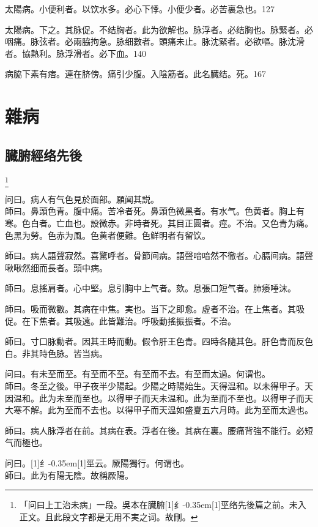 \documentclass[11pt,oneside,b5paper]{ctexbook}
\begin{document}
\begin{flushleft}
太陽病。小便利者。以饮水多。必心下悸。小便少者。必苦裏急也。127

太陽病。下之。其脉促。不结胸者。此为欲解也。脉浮者。必结胸也。脉緊者。必咽痛。脉弦者。必兩脇拘急。脉细數者。頭痛未止。脉沈緊者。必欲嘔。脉沈滑者。協熱利。脉浮滑者。必下血。140

病脇下素有痞。連在脐傍。痛引少腹。入陰筋者。此名臓结。死。167

\part{雜病}

\chapter{臓腑經络先後}

\footnote{「问曰上工治未病」一段。吳本在臓腑{\hbox{\scalebox{0.68}[1]{纟}\kern-0.35em\scalebox{0.64}[1]{巠}}}络先後篇之前。未入正文。且此段文字都是无用不実之词。故刪。}

问曰。病人有气色見於面部。願闻其説。\\
師曰。鼻頭色青。腹中痛。苦冷者死。鼻頭色微黑者。有水气。色黄者。胸上有寒。色白者。亡血也。設微赤。非時者死。其目正圓者。痙。不治。又色青为痛。色黑为勞。色赤为風。色黄者便難。色鲜明者有留饮。

師曰。病人語聲寂然。喜驚呼者。骨節间病。語聲喑喑然不徹者。心膈间病。語聲啾啾然细而長者。頭中病。

師曰。息搖肩者。心中堅。息引胸中上气者。欬。息張口短气者。肺痿唾沫。

師曰。吸而微數。其病在中焦。実也。当下之即愈。虛者不治。在上焦者。其吸促。在下焦者。其吸遠。此皆難治。呼吸動搖振振者。不治。

師曰。寸口脉動者。因其王時而動。假令肝王色青。四時各隨其色。肝色青而反色白。非其時色脉。皆当病。

问曰。有未至而至。有至而不至。有至而不去。有至而太過。何谓也。\\
師曰。冬至之後。甲子夜半少陽起。少陽之時陽始生。天得温和。以未得甲子。天因温和。此为未至而至也。以得甲子而天未温和。此为至而不至也。以得甲子而天大寒不解。此为至而不去也。以得甲子而天温如盛夏五六月時。此为至而太過也。

師曰。病人脉浮者在前。其病在表。浮者在後。其病在裏。腰痛背強不能行。必短气而極也。

问曰。{\hbox{\scalebox{0.68}[1]{纟}\kern-0.35em\scalebox{0.64}[1]{巠}}}云。厥陽獨行。何谓也。\\
師曰。此为有陽无陰。故稱厥陽。


\end{flushleft}
\end{document}
